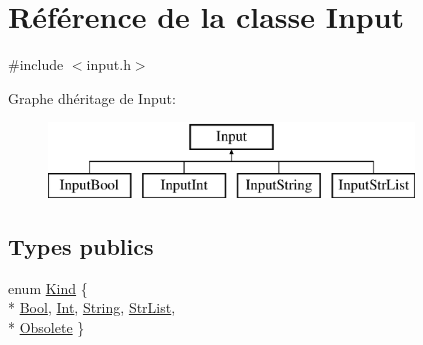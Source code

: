 \hypertarget{class_input}{}\section{Référence de la classe Input}
\label{class_input}


{\ttfamily \#include $<$input.\+h$>$}

Graphe d\textquotesingle{}héritage de Input\+:\begin{figure}[H]
\begin{center}
\leavevmode
\includegraphics[height=2.000000cm]{class_input}
\end{center}
\end{figure}
\subsection*{Types publics}
\begin{DoxyCompactItemize}
\item 
enum \hyperlink{class_input_a4138334795f6330759839617744e20a9}{Kind} \{ \\*
\hyperlink{class_input_a4138334795f6330759839617744e20a9a2dbfddf6e62a7a0ad551c5e636d1e7b5}{Bool}, 
\hyperlink{class_input_a4138334795f6330759839617744e20a9ac18e0843f53d18e021a7390507179f93}{Int}, 
\hyperlink{class_input_a4138334795f6330759839617744e20a9a0bf868e02e196a9573daba25c8988a4d}{String}, 
\hyperlink{class_input_a4138334795f6330759839617744e20a9abc5bd7ac23a47a029c0d9c8ca8802f4b}{Str\+List}, 
\\*
\hyperlink{class_input_a4138334795f6330759839617744e20a9a67a65b3167f2256495725a8522d3091e}{Obsolete}
 \}
\end{DoxyCompactItemize}
